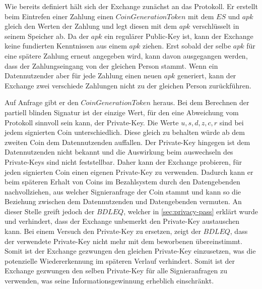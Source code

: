\documentclass[
	fontsize=12pt,
	headings=small,
	parskip=half,           %
	bibliography=totoc,
	numbers=noenddot,       %
	open=any,               %
]{scrreprt}
\begin{document}
Wie bereits definiert hält sich der Exchange zunächst an das Protokoll. Er erstellt beim Eintrefen einer Zahlung einen $CoinGenerationToken$ mit dem $ES$ und $apk$ gleich den Werten der Zahlung und legt diesen mit dem $apk$ verschlüsselt in seinem Speicher ab. Da der $apk$ ein regulärer Public-Key ist, kann der Exchange keine fundierten Kenntnissen aus einem $apk$ ziehen. Erst sobald der selbe $apk$ für eine spätere Zahlung erneut angegeben wird, kann davon ausgegangen werden, dass der Zahlungseingang von der gleichen Person stammt. Wenn ein Datennutzender aber für jede Zahlung einen neuen $apk$ generiert, kann der Exchange zwei verschiede Zahlungen nicht zu der gleichen Person zurückführen.

Auf Anfrage gibt er den $CoinGenerationToken$ heraus. Bei dem Berechnen der partiell blinden Signatur ist der einzige Wert, für den eine Abweichung vom Protokoll sinnvoll sein kann, der Private-Key. Die Werte $u,s,d,z,c,r$ sind bei jedem signierten Coin unterschiedlich. Diese gleich zu behalten würde ab dem zweiten Coin dem Datennutzenden auffallen. Der Private-Key hingegen ist dem Datennutzenden nicht bekannt und die Auswirkung beim auswechseln des Private-Keys sind nicht feststellbar. Daher kann der Exchange probieren, für jeden signierten Coin einen eigenen Private-Key zu verwenden. Dadurch kann er beim späteren Erhalt von Coins im Bezahlsystem durch den Datengebenden nachvollziehen, aus welcher Signieranfrage der Coin stammt und kann so die Beziehung zwischen dem Datennutzenden und Datengebenden vermuten. An dieser Stelle greift jedoch der $BDLEQ$, welcher in \ref{sec:privacy-pass} erklärt wurde und verhindert, dass der Exchange unbemerkt den Private-Key austauschen kann. Bei einem Versuch den Private-Key zu ersetzen, zeigt der $BDLEQ$, dass der verwendete Private-Key nicht mehr mit dem beworbenen übereinstimmt. Somit ist der Exchange gezwungen den gleichen Private-Key einzusetzen, was die potenzielle Wiedererkennung im späteren Verlauf verhindert. Somit ist der Exchange gezwungen den selben Private-Key für alle Signieranfragen zu verwenden, was seine Informationsgewinnung erheblich einschränkt.\\
\end{document}
